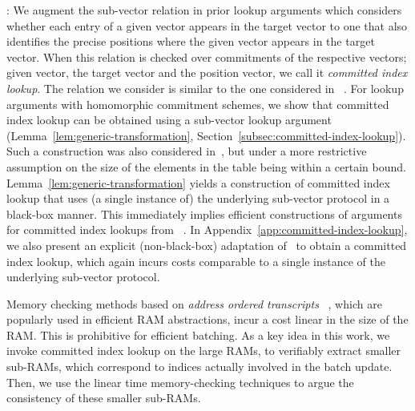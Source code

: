 \smallskip

: We augment the sub-vector relation in prior lookup arguments which
considers whether each entry of a given vector appears in the target vector to one that also identifies
the precise positions where the given vector appears in the target vector. When this relation is checked
over commitments of the respective vectors; given vector, the target vector and the position vector, we call
it {\em committed index lookup}. The relation we consider is similar to the one considered in ~\cite{lasso}.
For lookup arguments with homomorphic commitment schemes, we show that committed index lookup can be obtained
using a sub-vector lookup argument (Lemma~\ref{lem:generic-transformation}, Section~\ref{subsec:committed-index-lookup}). Such a construction was
also considered in~\cite{lasso}, but under a more restrictive assumption on the size of the elements in the table being
within a certain bound. Lemma~\ref{lem:generic-transformation} yields a construction of committed index lookup that uses (a single instance of) the underlying sub-vector protocol in a black-box manner. This immediately implies
efficient constructions of arguments for committed index lookups from
~\cite{CCS:ZBKMNS22,EPRINT:PosKat22,EPRINT:ZGKMR22,EPRINT:EagFioGab22,PKC:CFFLL24}. In Appendix~\ref{app:committed-index-lookup}, we also present an explicit (non-black-box) adaptation of~\cite{EPRINT:PosKat22} to obtain a committed index lookup, which again incurs costs comparable to a single instance of the underlying sub-vector protocol.

\smallskip


Memory checking methods based on {\em address ordered transcripts}
~\cite{NDSS:WSRBW15,USENIX:BCTV14,C:BCGTV13,SP:ZGKPP18}, which are popularly used in
efficient RAM abstractions, incur a cost linear in the size of the RAM. This is prohibitive for efficient batching. As a key idea in this work, we invoke committed index lookup on
the large RAMs, to verifiably extract smaller sub-RAMs, which correspond to indices actually involved in
the batch update. Then, we use the linear time memory-checking techniques to argue the consistency of these
smaller sub-RAMs. 

